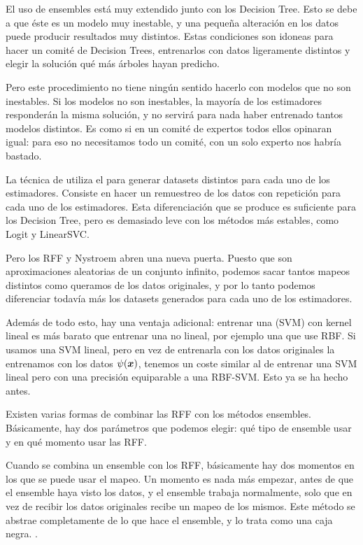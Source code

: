 \documentclass{article}
\begin{document}
El uso de ensembles está muy extendido junto con los Decision Tree. Esto se
debe a que éste es un modelo muy inestable, y una pequeña alteración en los
datos puede producir resultados muy distintos. Estas condiciones son idoneas
para hacer un comité de Decision Trees, entrenarlos con datos ligeramente
distintos y elegir la solución qué más árboles hayan predicho.

Pero este procedimiento no tiene ningún sentido hacerlo con modelos que no son
inestables. Si los modelos no son inestables, la mayoría de los estimadores
responderán la misma solución, y no servirá para nada haber entrenado tantos
modelos distintos. Es como si en un comité de expertos todos ellos opinaran
igual: para eso no necesitamos todo un comité, con un solo experto nos habría
bastado.

La técnica de  utiliza el  para generar datasets
distintos para cada uno de los estimadores. Consiste en hacer un remuestreo de
los datos con repetición para cada uno de los estimadores. Esta diferenciación
que se produce es suficiente para los Decision Tree, pero es demasiado leve con
los métodos más estables, como Logit y LinearSVC.

Pero los RFF y Nystroem abren una nueva puerta. Puesto que son aproximaciones
aleatorias de un conjunto infinito, podemos sacar tantos mapeos distintos
como queramos de los datos originales, y por lo tanto podemos diferenciar
todavía más los datasets generados para cada uno de los estimadores.

Además de todo esto, hay una ventaja adicional: entrenar una  (SVM) con kernel lineal es más barato que entrenar una no lineal, por
ejemplo una que use RBF. Si usamos una SVM lineal, pero en vez de entrenarla
con los datos originales la entrenamos con los datos $\psi(\bm{x})$, tenemos un
coste similar al de entrenar una SVM lineal pero con una precisión equiparable
a una RBF-SVM. Esto ya se ha hecho antes.

Existen varias formas de combinar las RFF con los métodos ensembles. Básicamente,
hay dos parámetros que podemos elegir: qué tipo de ensemble usar y en qué
momento usar las RFF.

Cuando se combina un ensemble con los RFF, básicamente hay dos momentos en
los que se puede usar el mapeo. Un momento es nada más empezar, antes de
que el ensemble haya visto los datos, y el ensemble trabaja normalmente, solo
que en vez de recibir los datos originales recibe un mapeo de los mismos.
Este método se abstrae completamente de lo que hace el ensemble, y lo trata
como una caja negra. .
\end{document}

